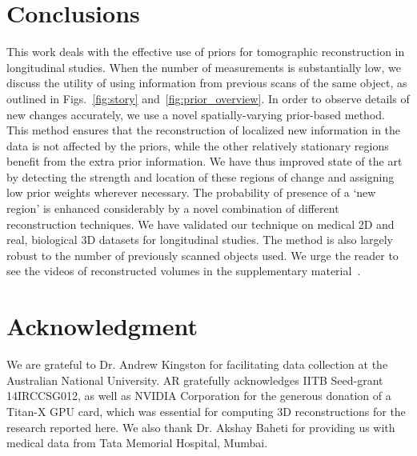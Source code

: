 \documentclass[journal]{IEEEtran}
\begin{document}
\section{Conclusions}
\label{sec:conclusions}
This work deals with the effective use of priors for tomographic
reconstruction in longitudinal studies. When the number of measurements is
substantially low, we discuss the utility of
using information from previous scans of the same object, as outlined in
Figs.~\ref{fig:story} and~\ref{fig:prior_overview}. In order to observe details of new changes
accurately, we use a novel
spatially-varying prior-based method. This method ensures that the
reconstruction of localized new information in the data is not
affected by the priors, while the other relatively stationary regions benefit from the extra prior information. %
We have thus
improved state of the art by detecting the strength and location
of these regions of change and
assigning low prior weights wherever necessary. The probability of
presence of a `new region' is enhanced considerably by a novel
combination of different reconstruction techniques.  We have validated
our technique on medical 2D and real, biological 3D datasets for
longitudinal studies. The method is also largely robust to the number
of previously scanned objects used. We urge the reader to see the
videos of reconstructed volumes in the supplementary
material~\cite{supp_paper}.

\section{Acknowledgment}
We are grateful to Dr. Andrew Kingston for facilitating data
collection at the Australian National University. AR gratefully
acknowledges IITB Seed-grant 14IRCCSG012, as well as NVIDIA
Corporation for the generous donation of a Titan-X GPU card, which was
essential for computing 3D reconstructions for the research reported
here. We also thank Dr. Akshay Baheti for providing us with medical
data from Tata Memorial Hospital, Mumbai.
{%
}
\end{document}
